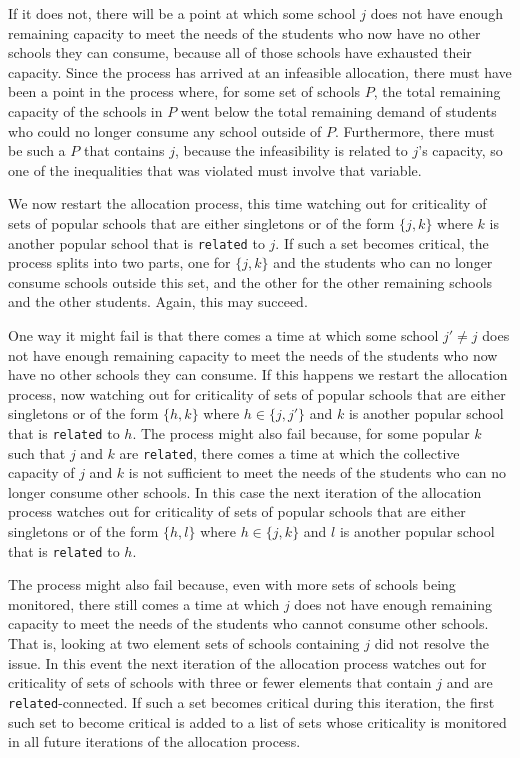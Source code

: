 \documentclass[12pt]{article}
\theoremstyle{definition}
\begin{document}
If it does not, there will be a point at which some school $j$ does
not have enough remaining capacity to meet the needs of the students
who now have no other schools they can consume, because all of those
schools have exhausted their capacity.  Since the process has arrived
at an infeasible allocation, there must have been a point in the
process where, for some set of schools $P$, the total remaining
capacity of the schools in $P$ went below the total remaining demand
of students who could no longer consume any school outside of $P$.
Furthermore, there must be such a $P$ that contains $j$, because the
infeasibility is related to $j$'s capacity, so one of the inequalities
that was violated must involve that variable.

We now restart the allocation process, this time watching out for
criticality of sets of popular schools that are either singletons or
of the form $\{j,k\}$ where $k$ is another popular school that is
\texttt{related} to $j$.  If such a set becomes critical, the process
splits into two parts, one for $\{j,k\}$ and the students who can no
longer consume schools outside this set, and the other for the other
remaining schools and the other students.  Again, this may
succeed.

One way it might fail is that there comes a time at which some school
$j' \ne j$ does not have enough remaining capacity to meet the needs
of the students who now have no other schools they can consume.  If
this happens we restart the allocation process, now watching out for
criticality of sets of popular schools that are either singletons or
of the form $\{h,k\}$ where $h \in \{j,j'\}$ and $k$ is another
popular school that is \texttt{related} to $h$.  The process might
also fail because, for some popular $k$ such that $j$ and $k$ are
\texttt{related}, there comes a time at which the collective capacity
of $j$ and $k$ is not sufficient to meet the needs of the students who
can no longer consume other schools.  In this case the next iteration
of the allocation process watches out for criticality of sets of
popular schools that are either singletons or of the form $\{h,l\}$
where $h \in \{j,k\}$ and $l$ is another popular school that is
\texttt{related} to $h$.

The process might also fail because, even with more sets of schools
being monitored, there still comes a time at which $j$ does not have
enough remaining capacity to meet the needs of the students who cannot
consume other schools.  That is, looking at two element sets of
schools containing $j$ did not resolve the issue.  In this event the
next iteration of the allocation process watches out for criticality
of sets of schools with three or fewer elements that contain $j$ and
are \texttt{related}-connected. If such a set becomes critical during
this iteration, the first such set to become critical is added to a
list of sets whose criticality is monitored in all future iterations
of the allocation process.
\end{document}
